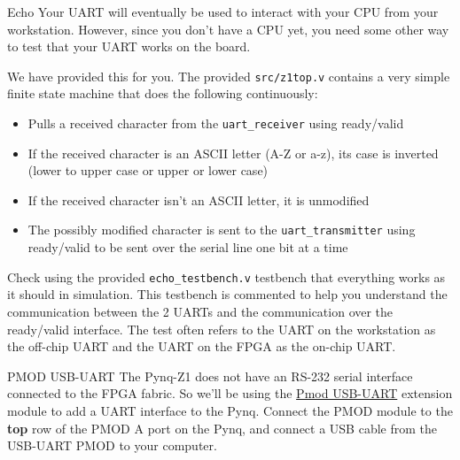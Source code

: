 \documentclass[11pt]{article}
\makeatletter
\renewcommand{\section}
{\@startsection {section}{1}{0pt}
 {-2ex}
 {1ex}
 {\bfseries\Large}}
\renewcommand{\subsection}
{\@startsection {subsection}{1}{0pt}
 {-1ex}
 {0.5ex}
 {\bfseries\normalsize}}
\makeatother
\begin{document}
\section{Echo}
Your UART will eventually be used to interact with your CPU from your workstation.
However, since you don't have a CPU yet, you need some other way to test that your UART works on the board.

We have provided this for you. The provided \verb|src/z1top.v| contains a very simple finite state machine that does the following continuously:

\begin{itemize}
  \item Pulls a received character from the \verb|uart_receiver| using ready/valid
  \item If the received character is an ASCII letter (A-Z or a-z), its case is inverted (lower to upper case or upper or lower case)
  \item If the received character isn't an ASCII letter, it is unmodified
  \item The possibly modified character is sent to the \verb|uart_transmitter| using ready/valid to be sent over the serial line one bit at a time
\end{itemize}

Check using the provided \verb|echo_testbench.v| testbench that everything works as it should in simulation.
This testbench is commented to help you understand the communication between the 2 UARTs and the communication over the ready/valid interface.
The test often refers to the UART on the workstation as the off-chip UART and the UART on the FPGA as the on-chip UART.

\subsection{PMOD USB-UART}
The Pynq-Z1 does not have an RS-232 serial interface connected to the FPGA fabric.
So we'll be using the \href{https://store.digilentinc.com/pmod-usbuart-usb-to-uart-interface/}{Pmod USB-UART} extension module to add a UART interface to the Pynq.
Connect the PMOD module to the \textbf{top} row of the PMOD A port on the Pynq, and connect a USB cable from the USB-UART PMOD to your computer.

\end{document}
